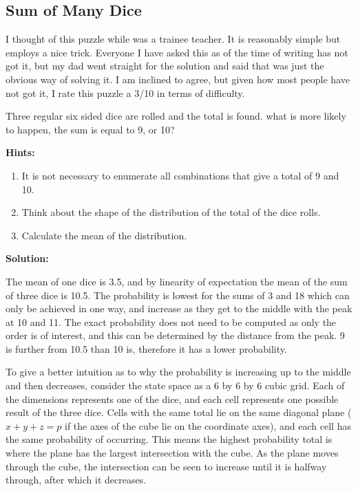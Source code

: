 
\subsection{Sum of Many Dice}

I thought of this puzzle while  was a trainee teacher. It is reasonably simple but employs a nice trick. Everyone I have asked this as of the time of writing has not got it, but my dad went straight for the solution and said that was just the obvious way of solving it. I am inclined to agree, but given how most people have not got it, I rate this puzzle a 3/10 in terms of difficulty.

Three regular six sided dice are rolled and the total is found. what is more likely to happen, the sum is equal to 9, or 10?

\textbf{Hints:}

\begin{enumerate}
    \item It is not necessary to enumerate all combinations that give a total of 9 and 10.
    \item Think about the shape of the distribution of the total of the dice rolls.
    \item Calculate the mean of the distribution.
\end{enumerate}

\textbf{Solution:}

The mean of one dice is 3.5, and by linearity of expectation the mean of the sum of three dice is 10.5. The probability is lowest for the sums of 3 and 18 which can only be achieved in one way, and increase as they get to the middle with the peak at 10 and 11. The exact probability does not need to be computed as only the order is of interest, and this can be determined by the distance from the peak. 9 is further from 10.5 than 10 is, therefore it has a lower probability.

To give a better intuition as to why the probability is increasing up to the middle and then decreases, consider the state space as a 6 by 6 by 6 cubic grid. Each of the dimensions represents one of the dice, and each cell represents one possible result of the three dice. Cells with the same total lie on the same diagonal plane ($x + y + z = p$ if the axes of the cube lie on the coordinate axes), and each cell has the same probability of occurring. This means the highest probability total is where the plane has the largest intersection with the cube. As the plane moves through the cube, the intersection can be seen to increase until it is halfway through, after which it decreases.

